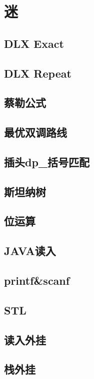 \section{迷}

\subsection{DLX Exact}

\subsection{DLX Repeat}

\subsection{蔡勒公式}

\subsection{最优双调路线}

\subsection{插头dp\_括号匹配}

\subsection{斯坦纳树}

\subsection{位运算}

\subsection{JAVA读入}

\subsection{printf\&scanf}

\subsection{STL}

\subsection{读入外挂}

\subsection{栈外挂}




